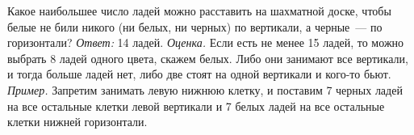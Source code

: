 \problem
Какое наибольшее число ладей можно расставить на шахматной доске, чтобы белые
не били никого (ни белых, ни черных) по вертикали, а черные~--- по горизонтали?
\solution
\emph{Ответ:} 14 ладей.
\emph{Оценка.}
Если есть не менее 15 ладей, то можно выбрать 8 ладей одного цвета, скажем
белых.
Либо они занимают все вертикали, и тогда больше ладей нет, либо две стоят на
одной вертикали и кого-то бьют.
\emph{Пример.}
Запретим занимать левую нижнюю клетку, и поставим 7 черных ладей на все
остальные клетки левой вертикали и 7 белых ладей на все остальные клетки нижней
горизонтали.
\endproblem
